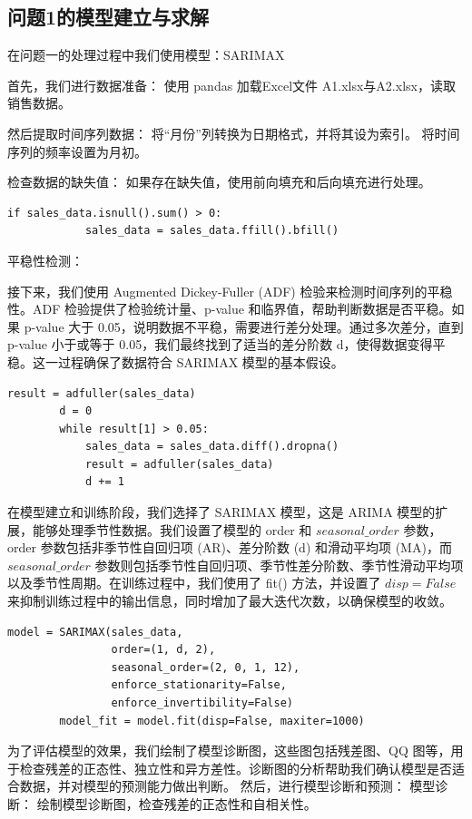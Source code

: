 \documentclass[a4paper]{article}
\begin{document}
	\subsection{问题1的模型建立与求解}
	在问题一的处理过程中我们使用模型：SARIMAX

	首先，我们进行数据准备：
	使用 pandas 加载Excel文件 A1.xlsx与A2.xlsx，读取销售数据。

	然后提取时间序列数据：
	将“月份”列转换为日期格式，并将其设为索引。
	将时间序列的频率设置为月初。

	检查数据的缺失值：
	如果存在缺失值，使用前向填充和后向填充进行处理。
	\begin{lstlisting}[caption={Python Example}, label={lst:example}]
		if sales_data.isnull().sum() > 0:
    		sales_data = sales_data.ffill().bfill()
	\end{lstlisting}

	平稳性检测：

	接下来，我们使用 Augmented Dickey-Fuller (ADF) 检验来检测时间序列的平稳性。ADF 检验提供了检验统计量、p-value 和临界值，帮助判断数据是否平稳。如果 p-value 大于 0.05，说明数据不平稳，需要进行差分处理。通过多次差分，直到 p-value 小于或等于 0.05，我们最终找到了适当的差分阶数 d，使得数据变得平稳。这一过程确保了数据符合 SARIMAX 模型的基本假设。
	\begin{lstlisting}[caption={Python Example}, label={lst:example}]
		result = adfuller(sales_data)
		d = 0
		while result[1] > 0.05:
			sales_data = sales_data.diff().dropna()
			result = adfuller(sales_data)
			d += 1
	\end{lstlisting}

	在模型建立和训练阶段，我们选择了 SARIMAX 模型，这是 ARIMA 模型的扩展，能够处理季节性数据。我们设置了模型的 order 和 $seasonal\_order$ 参数，order 参数包括非季节性自回归项 (AR)、差分阶数 (d) 和滑动平均项 (MA)，而 $seasonal\_order$ 参数则包括季节性自回归项、季节性差分阶数、季节性滑动平均项以及季节性周期。在训练过程中，我们使用了 fit() 方法，并设置了 $disp=False$ 来抑制训练过程中的输出信息，同时增加了最大迭代次数，以确保模型的收敛。
	\begin{lstlisting}[caption={Python Example}, label={lst:example}]
		model = SARIMAX(sales_data,
                order=(1, d, 2),
                seasonal_order=(2, 0, 1, 12),
                enforce_stationarity=False,
                enforce_invertibility=False)
		model_fit = model.fit(disp=False, maxiter=1000)
	\end{lstlisting}
	为了评估模型的效果，我们绘制了模型诊断图，这些图包括残差图、QQ 图等，用于检查残差的正态性、独立性和异方差性。诊断图的分析帮助我们确认模型是否适合数据，并对模型的预测能力做出判断。
	然后，进行模型诊断和预测：
	模型诊断：
	绘制模型诊断图，检查残差的正态性和自相关性。
\end{document}
